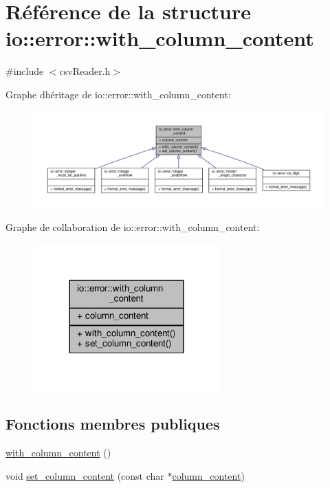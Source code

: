 \hypertarget{structio_1_1error_1_1with__column__content}{}\section{Référence de la structure io\+:\+:error\+:\+:with\+\_\+column\+\_\+content}
\label{structio_1_1error_1_1with__column__content}


{\ttfamily \#include $<$csv\+Reader.\+h$>$}



Graphe d\textquotesingle{}héritage de io\+:\+:error\+:\+:with\+\_\+column\+\_\+content\+:\nopagebreak
\begin{figure}[H]
\begin{center}
\leavevmode
\includegraphics[width=350pt]{structio_1_1error_1_1with__column__content__inherit__graph}
\end{center}
\end{figure}


Graphe de collaboration de io\+:\+:error\+:\+:with\+\_\+column\+\_\+content\+:\nopagebreak
\begin{figure}[H]
\begin{center}
\leavevmode
\includegraphics[width=204pt]{structio_1_1error_1_1with__column__content__coll__graph}
\end{center}
\end{figure}
\subsection*{Fonctions membres publiques}
\begin{DoxyCompactItemize}
\item 
\hyperlink{structio_1_1error_1_1with__column__content_aca754ef952be5ff4fcfe51ccb57ab66d}{with\+\_\+column\+\_\+content} ()
\item 
void \hyperlink{structio_1_1error_1_1with__column__content_ae7375310dc02425cb3cc4115b3ac8d6a}{set\+\_\+column\+\_\+content} (const char $\ast$\hyperlink{structio_1_1error_1_1with__column__content_a8587779769fbfb40155abb362137a523}{column\+\_\+content})
\end{DoxyCompactItemize}
